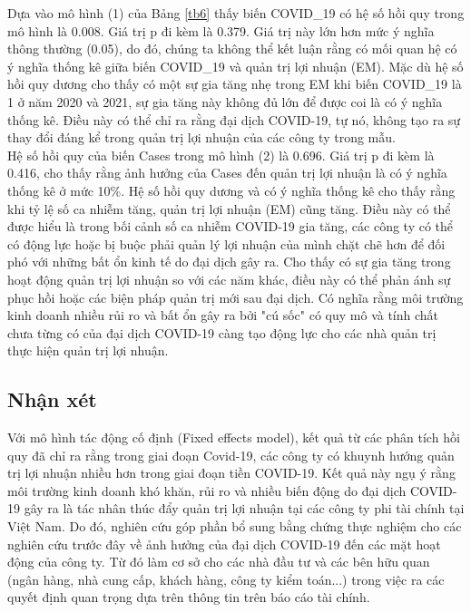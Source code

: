 \documentclass[a4paper]{article}
\begin{document}
\newpage
Dựa vào mô hình (1) của Bảng \ref{tb6} thấy biến COVID\_19 có hệ số hồi quy trong mô hình là 0.008. Giá trị p đi kèm là 0.379. Giá trị này lớn hơn mức ý nghĩa thông thường (0.05), do đó, chúng ta không thể kết luận rằng có mối quan hệ có ý nghĩa thống kê giữa biến COVID\_19 và quản trị lợi nhuận (EM). Mặc dù hệ số hồi quy dương cho thấy có một sự gia tăng nhẹ trong EM khi biến COVID\_19 là 1 ở năm 2020 và 2021, sự gia tăng này không đủ lớn để được coi là có ý nghĩa thống kê. Điều này có thể chỉ ra rằng đại dịch COVID-19, tự nó, không tạo ra sự thay đổi đáng kể trong quản trị lợi nhuận của các công ty trong mẫu.\\
\indent Hệ số hồi quy của biến Cases trong mô hình (2) là 0.696. Giá trị p đi kèm là 0.416, cho thấy rằng ảnh hưởng của Cases đến quản trị lợi nhuận là có ý nghĩa thống kê ở mức 10\%. Hệ số hồi quy dương và có ý nghĩa thống kê cho thấy rằng khi tỷ lệ số ca nhiễm tăng, quản trị lợi nhuận (EM) cũng tăng. Điều này có thể được hiểu là trong bối cảnh số ca nhiễm COVID-19 gia tăng, các công ty có thể có động lực hoặc bị buộc phải quản lý lợi nhuận của mình chặt chẽ hơn để đối phó với những bất ổn kinh tế do đại dịch gây ra. Cho thấy có sự gia tăng trong hoạt động quản trị lợi nhuận so với các năm khác, điều này có thể phản ánh sự phục hồi hoặc các biện pháp quản trị mới sau đại dịch. Có nghĩa rằng môi trường kinh doanh nhiều rủi ro và bất ổn gây ra bởi "cú sốc" có quy mô và tính chất chưa từng có của đại dịch COVID-19 càng tạo động lực cho các nhà quản trị thực hiện quản trị lợi nhuận.
\subsection{Nhận xét}
Với mô hình tác động cố định (Fixed effects model), kết quả từ các phân tích hồi quy đã chỉ ra rằng trong giai đoạn Covid-19, các công ty có khuynh hướng quản trị lợi nhuận nhiều hơn trong giai đoạn tiền COVID-19. Kết quả này ngụ ý rằng môi trường kinh doanh khó khăn, rủi ro và nhiều biến động do đại dịch COVID-19 gây ra là tác nhân thúc đẩy quản trị lợi nhuận tại các công ty phi tài chính tại Việt Nam. Do đó, nghiên cứu góp phần bổ sung bằng chứng thực nghiệm cho các nghiên cứu trước đây về ảnh hưởng của đại dịch COVID-19 đến các mặt hoạt động của công ty. Từ đó làm cơ sở cho các nhà đầu tư và các bên hữu quan (ngân hàng, nhà cung cấp, khách hàng, công ty kiểm toán...) trong việc ra các quyết định quan trọng dựa trên thông tin trên báo cáo tài chính.
\end{document}
